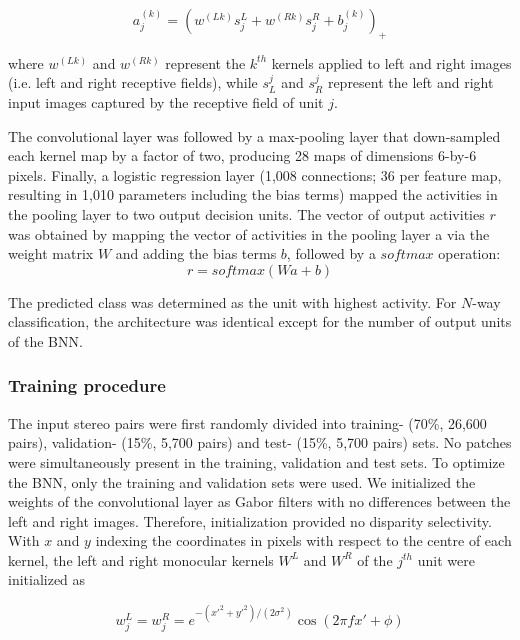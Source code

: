 \begin{equation}
  a_j^{(k)}=(w^{(Lk)}s_j^L + w^{(Rk)}s_j^R + b_j^{(k)})_+
\end{equation}

where $w^{(Lk)}$ and $w^{(Rk)}$ represent the $k^{th}$ kernels applied to left and right images (i.e. left and right receptive fields), while $s_L^j$ and $s_R^j$ represent the left and right input images captured by the receptive field of unit $j$. 

The convolutional layer was followed by a max-pooling layer that down-sampled each kernel map by a factor of two, producing 28 maps of dimensions 6-by-6 pixels. Finally, a logistic regression layer (1,008 connections; 36 per feature map, resulting in 1,010 parameters including the bias terms) mapped the activities in the pooling layer to two output decision units. The vector of output activities $r$ was obtained by mapping the vector of activities in the pooling layer a via the weight matrix $W$ and adding the bias terms $b$, followed by a $softmax$ operation:
\begin{equation}
  r=softmax(Wa+b)
\end{equation}

The predicted class was determined as the unit with highest activity. For $N$-way classification, the architecture was identical except for the number of output units of the BNN.

\subsubsection*{Training procedure}

The input stereo pairs were first randomly divided into training- (70\%, 26,600 pairs), validation- (15\%, 5,700 pairs) and test- (15\%, 5,700 pairs) sets. No patches were simultaneously present in the training, validation and test sets. To optimize the BNN, only the training and validation sets were used. We initialized the weights of the convolutional layer as Gabor filters with no differences between the left and right images. Therefore, initialization provided no disparity selectivity. With $x$ and $y$ indexing the coordinates in pixels with respect to the centre of each kernel, the left and right monocular kernels $W^L$ and $W^R$ of the $j^{th}$ unit were initialized as

\begin{equation} 
w_j^L = w_j^R = e^{-(x'^2+y'^2)/(2\sigma^2)} \cos⁡(2\pi f x' + \phi)
\end{equation}

